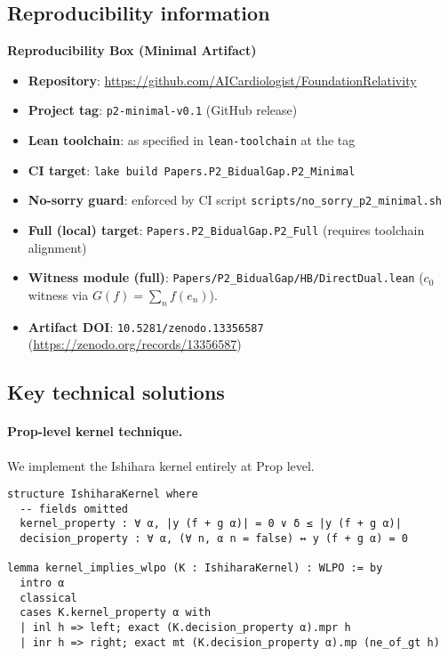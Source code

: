 \documentclass[11pt]{article}  %
\newcommand{\leanRepo}{\url{https://github.com/AICardiologist/FoundationRelativity}}
\begin{document}
\subsection{Reproducibility information}

\begin{mdframed}[backgroundcolor=gray!10]
\textbf{Reproducibility Box (Minimal Artifact)}
\begin{itemize}
\item \textbf{Repository}: \leanRepo
\item \textbf{Project tag}: \texttt{p2-minimal-v0.1} (GitHub release)
\item \textbf{Lean toolchain}: as specified in \texttt{lean-toolchain} at the tag
\item \textbf{CI target}: \texttt{lake build Papers.P2\_BidualGap.P2\_Minimal}
\item \textbf{No-sorry guard}: enforced by CI script \texttt{scripts/no\_sorry\_p2\_minimal.sh}
\item \textbf{Full (local) target}: \texttt{Papers.P2\_BidualGap.P2\_Full} (requires toolchain alignment)
\item \textbf{Witness module (full)}: \texttt{Papers/P2\_BidualGap/HB/DirectDual.lean} ($c_0$ witness via $G(f)=\sum_n f(e_n)$).
\item \textbf{Artifact DOI}: \texttt{10.5281/zenodo.13356587} (\url{https://zenodo.org/records/13356587})
\end{itemize}
\end{mdframed}

\subsection{Key technical solutions}

\paragraph{Prop-level kernel technique.}
We implement the Ishihara kernel entirely at Prop level.

\begin{lstlisting}[caption={Ishihara kernel (illustrative Lean snippet)}]
structure IshiharaKernel where
  -- fields omitted
  kernel_property : ∀ α, |y (f + g α)| = 0 ∨ δ ≤ |y (f + g α)|
  decision_property : ∀ α, (∀ n, α n = false) ↔ y (f + g α) = 0

lemma kernel_implies_wlpo (K : IshiharaKernel) : WLPO := by
  intro α
  classical
  cases K.kernel_property α with
  | inl h => left; exact (K.decision_property α).mpr h
  | inr h => right; exact mt (K.decision_property α).mp (ne_of_gt h)
\end{lstlisting}
\end{document}
